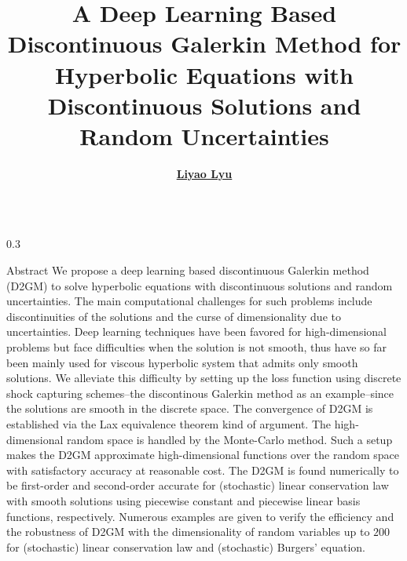 \documentclass{msuposter}
\title{A Deep Learning Based  Discontinuous Galerkin Method for Hyperbolic Equations with Discontinuous Solutions and Random Uncertainties}
\author{\href{http://lylyu.com/}{\textbf{Liyao Lyu}} }
\institute{
Department of Computational Mathematics, Science and Engineering, Michigan State University,
lyuliyao@msu.edu\\
}
\newcommand{\colwidth}{0.3\linewidth}
\begin{document}
\begin{frame}{}
\begin{columns}[t]
\begin{column}{\colwidth}
\begin{block}{Abstract}
\large{We propose a deep learning based discontinuous Galerkin method (D2GM) to solve hyperbolic equations with discontinuous solutions and random uncertainties. The main computational challenges for such problems include discontinuities of the solutions and the curse of dimensionality due to uncertainties. Deep learning techniques have been favored for
high-dimensional problems but face difficulties when the solution is not smooth, thus have so far been mainly used for
viscous hyperbolic system that admits only smooth solutions.  We alleviate this difficulty by setting up the loss function using discrete shock capturing schemes--the discontinous Galerkin method as an example--since the solutions are smooth in the discrete space.  The convergence of D2GM is established via the Lax equivalence theorem kind of argument. The high-dimensional random space
is handled by the Monte-Carlo method. Such a setup makes the D2GM approximate high-dimensional functions over the random space with satisfactory accuracy at reasonable cost. The D2GM is found numerically to be first-order and second-order accurate for (stochastic) linear conservation law with smooth solutions using piecewise constant and piecewise linear basis functions, respectively. Numerous examples are given to verify the efficiency and the robustness of D2GM with the dimensionality of random variables up to $200$ for (stochastic) linear conservation law and (stochastic) Burgers' equation.}\end{block}



\end{column}
\end{columns}
\end{frame}
\end{document}
